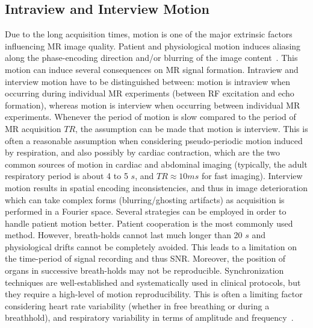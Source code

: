 \documentclass[english,version-2022-01]{uzl-thesis} %
\begin{document}
\subsection{Intraview and Interview Motion} \label{SubSec:IntraviewandInterviewMotion}
Due to the long acquisition times, motion is one of the major extrinsic factors influencing MR image quality. Patient and physiological motion induces aliasing along the phase-encoding direction and/or blurring of the image content~\cite{Kuestner2022}.
This motion can induce several consequences on MR signal formation. Intraview and interview motion have to be distinguished between: motion is intraview when occurring during individual MR experiments (between RF excitation and echo formation), whereas motion is interview when occurring between individual MR experiments. Whenever the period of motion is slow compared to the period of MR acquisition 
$TR$, the assumption can be made that motion is interview. This is often a reasonable assumption when considering pseudo-periodic motion induced by respiration, and also possibly by cardiac contraction, which are the two common sources of motion in cardiac and abdominal imaging (typically, the adult respiratory period is about 4 to 5 $s$, and $TR \approx 10 ms$ for fast imaging). Interview motion results in spatial encoding inconsistencies, and thus in image deterioration which can take complex forms (blurring/ghosting artifacts) as acquisition is performed in a Fourier space. Several strategies can be employed in order to handle patient motion better. Patient cooperation is the most commonly used method. However, breath-holds cannot last much longer than 20 $s$ and physiological drifts cannot be completely avoided. This leads to a limitation on the time-period of signal recording and thus SNR. Moreover, the position of organs in successive breath-holds may not be reproducible. Synchronization techniques are well-established and systematically used in clinical protocols, but they require a high-level of motion reproducibility. This is often a limiting factor considering heart rate variability (whether in free breathing or during a breathhold), and respiratory variability in terms of amplitude and frequency~\cite{GRICS}. 
\end{document}
